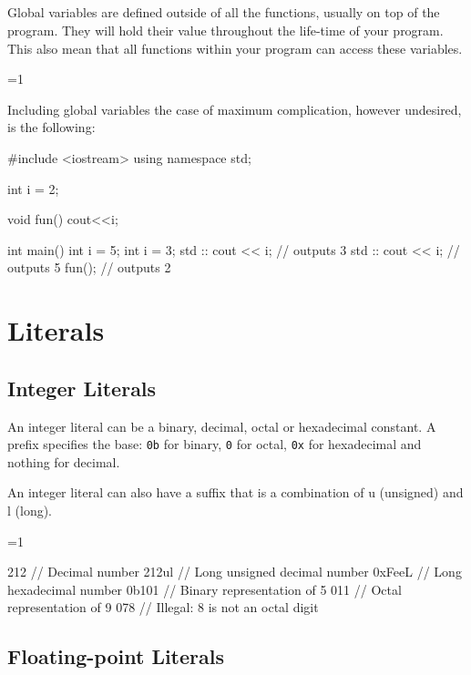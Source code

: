 \documentclass[10pt,a4paper]{scrartcl}
\gdef\conditionmacro{1}
\begin{document}
\begin{multicols*}{2}
\subsection{}

Global variables are defined outside of all the functions, usually on top of the program. They will hold their value throughout the life-time of your program. This also mean that all functions within your program can access these variables.

\ifnum\conditionmacro=1

Including global variables the case of maximum complication, however undesired, is the following:

\begin{TPCpp}
#include <iostream>
using namespace std;

int i = 2;

void fun(){
	cout<<i;
}

int main(){
	int i = 5;
	{
		int i = 3;
		std :: cout << i;   // outputs 3
	}
	std :: cout << i;     // outputs 5
	fun();                // outputs 2
}
\end{TPCpp}
\fi

\section{Literals}

\subsection{Integer Literals}

An integer literal can be a binary, decimal, octal or hexadecimal constant. A prefix specifies the base: \verb+0b+ for binary, \verb+0+ for octal, \verb+0x+ for hexadecimal and nothing for decimal.

An integer literal can also have a suffix that is a combination of u (unsigned) and l (long).

\ifnum\conditionmacro=1
\begin{TPCpp}
212     // Decimal number
212ul   // Long unsigned decimal number
0xFeeL  // Long hexadecimal number
0b101   // Binary representation of 5
011     // Octal representation of 9
078     // Illegal: 8 is not an octal digit
\end{TPCpp}
\fi

\subsection{Floating-point Literals}


\end{multicols*}
\end{document}
